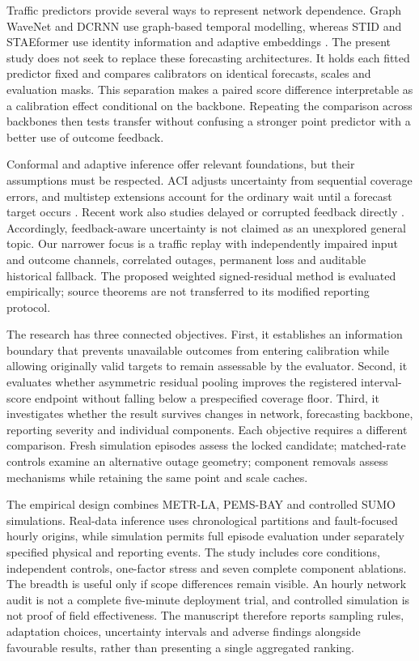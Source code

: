 Traffic predictors provide several ways to represent network dependence. Graph WaveNet and DCRNN use graph-based temporal modelling, whereas STID and STAEformer use identity information and adaptive embeddings \citep{wu2019,li2018,shao2022,liu2023}. The present study does not seek to replace these forecasting architectures. It holds each fitted predictor fixed and compares calibrators on identical forecasts, scales and evaluation masks. This separation makes a paired score difference interpretable as a calibration effect conditional on the backbone. Repeating the comparison across backbones then tests transfer without confusing a stronger point predictor with a better use of outcome feedback.

Conformal and adaptive inference offer relevant foundations, but their assumptions must be respected. ACI adjusts uncertainty from sequential coverage errors, and multistep extensions account for the ordinary wait until a forecast target occurs \citep{gibbs2021,hallberg2024}. Recent work also studies delayed or corrupted feedback directly \citep{elhalabi2026,wang2026}. Accordingly, feedback-aware uncertainty is not claimed as an unexplored general topic. Our narrower focus is a traffic replay with independently impaired input and outcome channels, correlated outages, permanent loss and auditable historical fallback. The proposed weighted signed-residual method is evaluated empirically; source theorems are not transferred to its modified reporting protocol.

The research has three connected objectives. First, it establishes an information boundary that prevents unavailable outcomes from entering calibration while allowing originally valid targets to remain assessable by the evaluator. Second, it evaluates whether asymmetric residual pooling improves the registered interval-score endpoint without falling below a prespecified coverage floor. Third, it investigates whether the result survives changes in network, forecasting backbone, reporting severity and individual components. Each objective requires a different comparison. Fresh simulation episodes assess the locked candidate; matched-rate controls examine an alternative outage geometry; component removals assess mechanisms while retaining the same point and scale caches.

The empirical design combines METR-LA, PEMS-BAY and controlled SUMO simulations. Real-data inference uses chronological partitions and fault-focused hourly origins, while simulation permits full episode evaluation under separately specified physical and reporting events. The study includes core conditions, independent controls, one-factor stress and seven complete component ablations. The breadth is useful only if scope differences remain visible. An hourly network audit is not a complete five-minute deployment trial, and controlled simulation is not proof of field effectiveness. The manuscript therefore reports sampling rules, adaptation choices, uncertainty intervals and adverse findings alongside favourable results, rather than presenting a single aggregated ranking.

